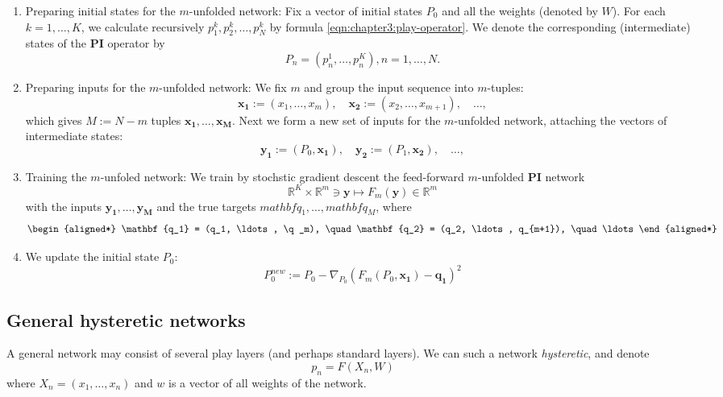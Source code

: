 \begin{enumerate}
\item Preparing initial states for the $m$-unfolded network: Fix a vector of initial states $P_0$ and all the weights (denoted by $W$). For each $k=1, \ldots, K$, we calculate recursively $p_{1}^{k}, p_{2}^{k}, \ldots, p_{N}^{k}$ by formula \ref{eqn:chapter3:play-operator}. We denote the corresponding (intermediate) states of the \textbf{PI} operator by
  \begin{equation*}
    P_n = (p_{n}^{1}, \ldots, p_{n}^{K}), n = 1, \ldots, N.
  \end{equation*}
\item Preparing inputs for the $m$-unfolded network: We fix $m$ and group the input sequence into $m$-tuples:
  \begin{equation*}
    \mathbf{x_1} := (x_1, \ldots, x_m), \quad \mathbf{x_2} := (x_2, \ldots, x_{m+1}), \quad \ldots,
  \end{equation*}
  which gives $M := N-m$ tuples $\mathbf{x_1}, \ldots, \mathbf{x_M}$. Next we form a new set of inputs for the $m$-unfolded network, attaching the vectors of intermediate states:
  \begin{equation*}
    \mathbf{y_1} := (P_0, \mathbf{x_1}), \quad \mathbf{y_2} := (P_1, \mathbf{x_2}), \quad \ldots,
  \end{equation*}

\item Training the $m$-unfoled network: We train by stochstic gradient descent the feed-forward $m$-unfolded \textbf{PI} network
  \begin{equation*}
    \mathbb{R}^{K} \times \mathbb{R}^{m} \ni \mathbf{y} \mapsto F_{m}(\mathbf{y}) \in \mathbb{R}^m
  \end{equation*}
  with the inputs $\mathbf{y_1}, \ldots, \mathbf{y_M}$ and the true targets $mathbf{q_1}, \ldots, mathbf{q_M}$, where
  \begin{equation*}
    \begin{aligned*}
      \mathbf{q_1} = (q_1, \ldots, \q_m), \quad \mathbf{q_2} = (q_2, \ldots, q_{m+1}), \quad \ldots
    \end{aligned*}
  \end{equation*}

\item We update the initial state $P_0$:
  \begin{equation*}
    P_{0}^{new} := P_{0} - \nabla_{P_0} (F_m(P_0, \mathbf{x_1}) - \mathbf{q_1})^2
  \end{equation*}
\end{enumerate}

\subsection{General hysteretic networks\label{sec:chapter3:general-hysteretic-networks}}
A general network may consist of several play layers (and perhaps standard layers). We can such a network \textsl{hysteretic}, and denote
\begin{equation*}
  p_n = F(X_n, W)
\end{equation*}
where $X_n = (x_1, \ldots, x_n)$ and $w$ is a vector of all weights of the network.
